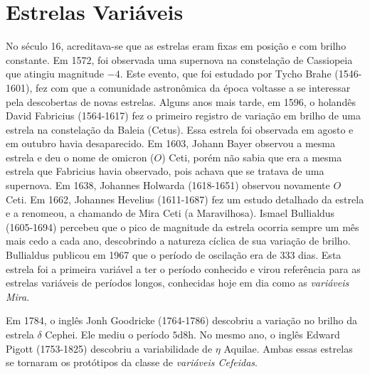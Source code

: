 \chapter{Estrelas Variáveis}
\label{cap:estrelas}

\nocite{Catelan_book}

No século 16, acreditava-se que as estrelas eram fixas em posição e com brilho constante. Em 1572, foi observada uma supernova na constelação de Cassiopeia que atingiu magnitude $-4$. Este evento, que foi estudado por Tycho Brahe (1546-1601), fez com que a comunidade astronômica da época voltasse a se interessar pela descobertas de novas estrelas. Alguns anos mais tarde, em 1596, o holandês David Fabricius (1564-1617) fez o primeiro registro de variação em brilho de uma estrela na constelação da Baleia (Cetus).  Essa estrela foi observada em agosto e em outubro havia desaparecido. Em 1603, Johann Bayer observou a mesma estrela e deu o nome de omicron ($O$) Ceti, porém não sabia que era a mesma estrela que Fabricius havia observado, pois achava que se tratava de uma supernova. Em 1638, Johannes Holwarda (1618-1651) observou novamente $O$ Ceti. Em 1662, Johannes Hevelius (1611-1687) fez um estudo detalhado da estrela e a renomeou, a chamando de Mira Ceti (a Maravilhosa). Ismael Bullialdus (1605-1694) percebeu que o pico de magnitude da estrela ocorria sempre um mês mais cedo a cada ano, descobrindo a natureza cíclica de sua variação de brilho. Bullialdus publicou em 1967 que o período de oscilação era de 333 dias. Esta estrela foi a primeira variável a ter o período conhecido e virou referência para as estrelas variáveis de períodos longos, conhecidas hoje em dia como as \textit{variáveis Mira}.

Em 1784, o inglês Jonh Goodricke (1764-1786) descobriu a variação no brilho da estrela $\delta$ Cephei. Ele mediu o período $5\si{\day}8\si{\hour}$. No mesmo ano, o inglês Edward Pigott (1753-1825) descobriu a variabilidade de $\eta$ Aquilae. Ambas essas estrelas se tornaram os protótipos da classe de \textit{variáveis Cefeidas}.

